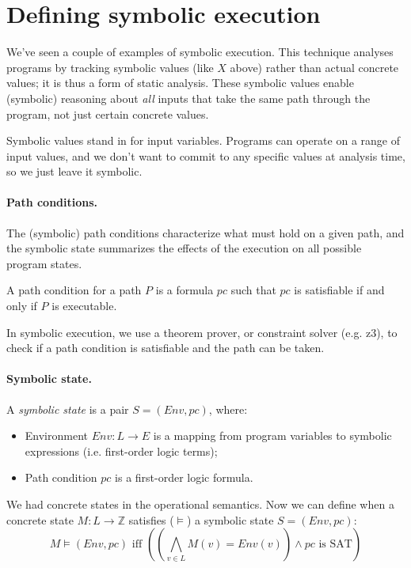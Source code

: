 \documentclass[11pt]{article}
\begin{document}
\section*{Defining symbolic execution}
We've seen a couple of examples of symbolic execution.
This technique analyses programs by tracking symbolic values (like $X$
above) rather than actual concrete values; it is thus a form of static
analysis. These symbolic values enable (symbolic) reasoning about
\emph{all} inputs that take the same path through the program, not
just certain concrete values.

Symbolic values stand in for input variables. Programs can operate on
a range of input values, and we don't want to commit to any specific
values at analysis time, so we just leave it symbolic.

\paragraph{Path conditions.} The (symbolic) path conditions characterize what must
hold on a given path, and the symbolic state summarizes the effects
of the execution on all possible program states.

A path condition for a path $P$ is a formula $\mathit{pc}$
such that $\mathit{pc}$ is satisfiable if and only if $P$ is
executable.

In symbolic execution, we use a theorem prover, or constraint solver (e.g. z3),
to check if a path condition is satisfiable and the path can be taken.

\paragraph{Symbolic state.} A \emph{symbolic state} is a pair $S = (\mathit{Env}, \mathit{pc})$, where:
\begin{itemize}[noitemsep]
\item Environment $\mathit{Env}: L \rightarrow E$ is a mapping from program variables to symbolic expressions (i.e. first-order logic terms);
\item Path condition $\mathit{pc}$ is a first-order logic formula.
\end{itemize}

We had concrete states in the operational semantics. Now we can define when a concrete state $M : L \rightarrow \mathbb{Z}$ satisfies ($\models$) a symbolic state $S = (\mathit{Env}, \mathit{pc})$:
\[ M \models (\mathit{Env}, \mathit{pc}) \mbox{ iff } \left( (\bigwedge_{v \in L} M(v) = \mathit{Env}(v)) \wedge \mbox{$\mathit{pc}$ is SAT} \right) \]
\end{document}
